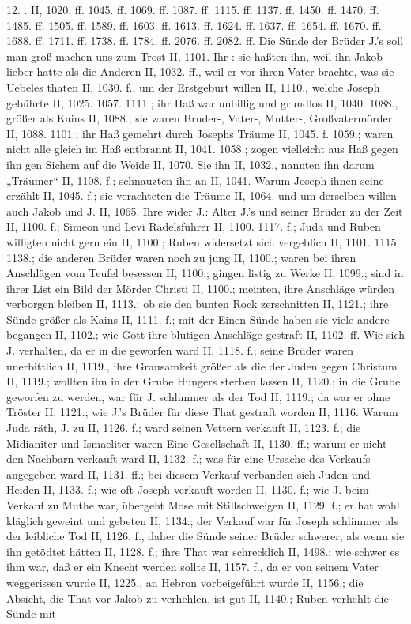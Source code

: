 12. . II, 1020. ff. 1045. ff. 1069. ff. 1087. ff. 1115. ff. 1137. ff. 1450. ff. 1470. ff. 1485. ff. 1505. ff. 1589. ff. 1603. ff. 1613. ff. 1624. ff. 1637. ff. 1654. ff. 1670. ff. 1688. ff. 1711. ff. 1738. ff. 1784. ff. 2076. ff. 2082. ff. Die Sünde der Brüder J.’s soll man groß machen uns zum Trost II, 1101. Ihr : sie haßten ihn, weil ihn Jakob lieber hatte als die Anderen II, 1032. ff., weil er vor ihren Vater brachte, was sie Uebeles thaten II, 1030. f., um der Erstgeburt willen II, 1110., welche Joseph gebührte II, 1025. 1057. 1111.; ihr Haß war unbillig und grundlos II, 1040. 1088., größer als Kains II, 1088., sie waren Bruder-, Vater-, Mutter-, Großvatermörder II,
1088. 1101.; ihr Haß gemehrt durch Josephs Träume II, 1045. f. 1059.; waren nicht alle gleich im Haß entbrannt II, 1041. 1058.; zogen vielleicht aus Haß gegen ihn gen Sichem auf die Weide II, 1070. Sie  ihn II, 1032., nannten ihn darum „Träumer“ II, 1108. f.; schnauzten ihn an II, 1041. Warum Joseph ihnen seine  erzählt II, 1045. f.; sie verachteten die Träume II, 1064. und um derselben willen auch Jakob und J. II, 1065. Ihre  wider J.: Alter J.’s und seiner Brüder zu der Zeit II, 1100. f.; Simeon und Levi Rädelsführer II, 1100. 1117. f.; Juda und Ruben willigten nicht gern ein II, 1100.; Ruben widersetzt sich vergeblich II, 1101. 1115. 1138.; die anderen Brüder waren noch zu jung II, 1100.; waren bei ihren Anschlägen vom Teufel besessen II, 1100.; gingen listig zu Werke II, 1099.; sind in ihrer List ein Bild der Mörder Christi II, 1100.; meinten, ihre Anschläge würden verborgen bleiben II, 1113.; ob sie den bunten Rock zerschnitten II, 1121.; ihre Sünde größer als Kains II, 1111. f.; mit der Einen Sünde haben sie viele andere begangen II, 1102.; wie Gott ihre blutigen Anschläge gestraft II, 1102. ff. Wie sich J. verhalten, da er in die  geworfen ward II, 1118. f.; seine Brüder waren unerbittlich II, 1119., ihre Grausamkeit größer als die der Juden gegen Christum II, 1119.; wollten ihn in der Grube Hungers sterben lassen II, 1120.; in die Grube geworfen zu werden, war für J. schlimmer als der Tod II, 1119.; da war er ohne Tröster II, 1121.; wie J.’s Brüder für diese That gestraft worden II, 1116. Warum Juda räth, J. zu  II, 1126. f.; ward seinen Vettern verkauft II, 1123. f.; die Midianiter und Ismaeliter waren Eine Gesellschaft II, 1130. ff.; warum er nicht den Nachbarn verkauft ward II, 1132. f.; was für eine Ursache des Verkaufs angegeben ward II, 1131. ff.; bei diesem Verkauf verbanden sich Juden und Heiden II, 1133. f.; wie oft Joseph verkauft worden II, 1130. f.; wie J. beim Verkauf zu Muthe war, übergeht Mose mit Stillschweigen II, 1129. f.; er hat wohl kläglich geweint und gebeten II, 1134.; der Verkauf war für Joseph schlimmer als der leibliche Tod II, 1126. f., daher die Sünde seiner Brüder schwerer, als wenn sie ihn getödtet hätten II, 1128. f.; ihre That war schrecklich II, 1498.; wie schwer es ihm war, daß er ein Knecht werden sollte II, 1157. f., da er von seinem Vater weggerissen wurde II, 1225., an Hebron vorbeigeführt wurde II, 1156.; die Absicht, die That vor Jakob zu verhehlen, ist gut II, 1140.; Ruben verhehlt die Sünde mit 